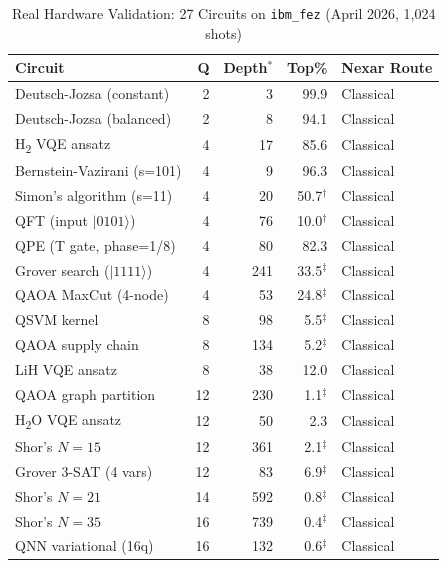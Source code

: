 \documentclass[10pt,conference]{IEEEtran}
\begin{document}
\begin{table}[htbp]
\caption{Real Hardware Validation: 27 Circuits on \texttt{ibm\_fez} (April 2026, 1{,}024 shots)}
\label{tab:hardware-validation}
\centering
\footnotesize
\setlength{\tabcolsep}{3pt}
\begin{tabular}{l r r r l}
\toprule
\textbf{Circuit} & \textbf{Q} & \textbf{Depth$^{*}$} & \textbf{Top\%} & \textbf{Nexar Route} \\
\midrule
Deutsch-Jozsa (constant)     &   2 &     3 & 99.9 & Classical \\
Deutsch-Jozsa (balanced)     &   2 &     8 & 94.1 & Classical \\
H\textsubscript{2} VQE ansatz              &   4 &    17 & 85.6 & Classical \\
Bernstein-Vazirani (s=101)   &   4 &     9 & 96.3 & Classical \\
Simon's algorithm (s=11)     &   4 &    20 & 50.7$^{\dagger}$ & Classical \\
QFT (input $|0101\rangle$)    &   4 &    76 & 10.0$^{\dagger}$ & Classical \\
QPE (T gate, phase=1/8)      &   4 &    80 & 82.3 & Classical \\
Grover search ($|1111\rangle$) &  4 &   241 &  33.5$^{\ddagger}$ & Classical \\
QAOA MaxCut (4-node)         &   4 &    53 & 24.8$^{\ddagger}$ & Classical \\
QSVM kernel                  &   8 &    98 &  5.5$^{\ddagger}$ & Classical \\
QAOA supply chain            &   8 &   134 &  5.2$^{\ddagger}$ & Classical \\
LiH VQE ansatz               &   8 &    38 & 12.0 & Classical \\
QAOA graph partition         &  12 &   230 &  1.1$^{\ddagger}$ & Classical \\
H\textsubscript{2}O VQE ansatz             &  12 &    50 &  2.3 & Classical \\
Shor's $N=15$                &  12 &   361 &  2.1$^{\ddagger}$ & Classical \\
Grover 3-SAT (4 vars)        &  12 &    83 &  6.9$^{\ddagger}$ & Classical \\
Shor's $N=21$                &  14 &   592 &  0.8$^{\ddagger}$ & Classical \\
Shor's $N=35$                &  16 &   739 &  0.4$^{\ddagger}$ & Classical \\
QNN variational (16q)        &  16 &   132 &  0.6$^{\ddagger}$ & Classical \\

\end{tabular}
\end{table}
\end{document}
